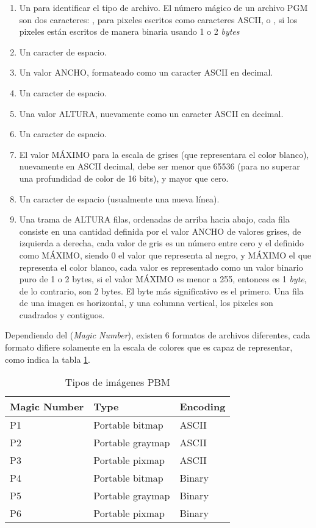\begin{enumerate}
	\item Un  para identificar el tipo de archivo. El número mágico de un archivo PGM son dos caracteres: , para pixeles escritos como caracteres ASCII, o , si los pixeles están escritos de manera binaria usando 1 o 2 \emph{bytes}
	\item Un caracter de espacio.
	\item Un valor ANCHO, formateado como un caracter ASCII en decimal.
	\item Un caracter de espacio.
	\item Una valor ALTURA, nuevamente como un caracter ASCII en decimal.
	\item Un caracter de espacio.
	\item El valor MÁXIMO para la escala de grises (que representara el color blanco), nuevamente en ASCII decimal, debe ser menor que 65536 (para no superar una profundidad de color de 16 bits), y mayor que cero.
	\item Un caracter de espacio (usualmente una nueva línea).
	\item Una trama de ALTURA filas, ordenadas de arriba hacia abajo, cada fila consiste en una cantidad definida por el valor ANCHO de valores grises, de izquierda a derecha, cada valor de gris es un número entre cero y el definido como MÁXIMO, siendo $0$ el valor que representa al negro, y MÁXIMO el que representa el color blanco, cada valor es representado como un valor binario puro de 1 o 2 bytes, si el valor MÁXIMO es menor a 255, entonces es 1 \emph{byte}, de lo contrario, son 2 bytes. El byte más significativo es el primero.
	Una fila de una imagen es horizontal, y una columna vertical, los pixeles son cuadrados y contiguos.
\end{enumerate}

Dependiendo del  (\emph{Magic Number}), existen 6 formatos de archivos diferentes, cada formato difiere solamente en la escala de colores que es capaz de representar, como indica la tabla \ref{ch:implementacion:tabla:tiposdearchivospbm}.

\begin{table}[h]
	\centering
	\begin{tabular}{|l|l|l|}
		\hline
		Magic Number	&	Type				&	Encoding\\ \hline
		P1				&	Portable bitmap		&	ASCII \\ \hline
		P2				&	Portable graymap	&	ASCII \\ \hline
		P3				&	Portable pixmap		&	ASCII \\ \hline
		P4				&	Portable bitmap		&	Binary \\ \hline
		P5				&	Portable graymap	&	Binary \\ \hline
		P6				&	Portable pixmap		&	Binary \\ \hline
	\end{tabular}
	\caption{Tipos de imágenes PBM}
	\label{ch:implementacion:tabla:tiposdearchivospbm}
\end{table}

